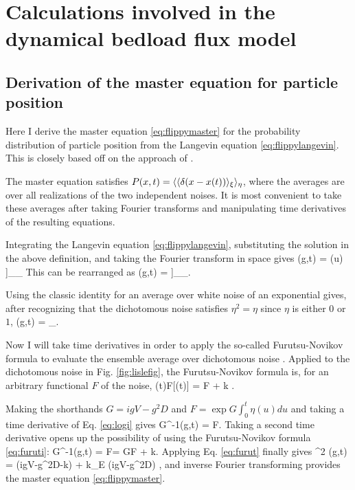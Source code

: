 
\chapter{Calculations involved in the dynamical bedload flux model}
\label{sec:appendixAfluc}
\section{Derivation of the master equation for particle position}
\label{sec:appAmaster}
Here I derive the master equation \ref{eq:flippymaster} for the probability distribution of particle position from the Langevin equation \ref{eq:flippylangevin}. This is closely based off on the approach of \citet{Balakrishnan1993}.

The master equation satisfies $P(x,t) = \langle\langle \delta(x-x(t))\rangle_\xi \rangle_\eta$, where the averages are over all realizations of the two independent noises. It is most convenient to take these averages after taking Fourier transforms and manipulating time derivatives of the resulting equations.

Integrating the Langevin equation \ref{eq:flippylangevin}, substituting the solution in the above definition, and taking the Fourier transform in space gives
\be {}(g,t) = \Big\bra  \Big\bra \exp \Big[- i g \int_0^t du [V+\sqrt{2D}\xi(u)]\eta(u) \Big]\Big\ket_\eta \Big\ket_\xi\ee
This can be rearranged as
\be {}(g,t) = \Big\bra \exp{} \Big\bra \exp{}\Big]\Big\ket_\xi \Big\ket_\eta .\ee

Using the classic identity for an average over white noise of an exponential \citep{Balakrishnan1993,VanKampen2007} gives, after recognizing that the dichotomous noise satisfies $\eta^2 = \eta$ since $\eta$ is either $0$ or $1$,
\be {}(g,t) = \Big\bra \exp{}\Big\ket_\eta. \label{eq:logi}\ee

Now I will take time derivatives in order to apply the so-called Furutsu-Novikov formula to evaluate the ensemble average over dichotomous noise \citep{Shapiro1978}. Applied to the dichotomous noise in Fig. \ref{fig:lislefig}, the Furutsu-Novikov formula is, for an arbitrary functional $F$ of the noise,
\be \pt \bra \eta(t)F[\eta(t)] \ket = \bra \eta \pt F \ket + k   \label{eq:furuti}.\ee


Making the shorthands $G = igV-g^2D$ and $F=\exp G\int_0^t \eta(u)du$ and taking a time derivative of Eq. \ref{eq:logi} gives
\be G^{-1}\pt {}(g,t) = \bra \eta F\ket. \label{eq:furut}\ee
Taking a second time derivative opens up the possibility of using the Furutsu-Novikov formula \ref{eq:furuti}: 
\be G^{-1}\pt {}(g,t) = \pt \bra \eta F\ket = G\bra \eta F \ket + k. \ee
Applying Eq. \ref{eq:furut} finally gives
\be \pt^2 (g,t)  = (igV-g^2D-k)\pt  {} + k_E (igV-g^2D) ,\ee
and inverse Fourier transforming provides the master equation \ref{eq:flippymaster}.

